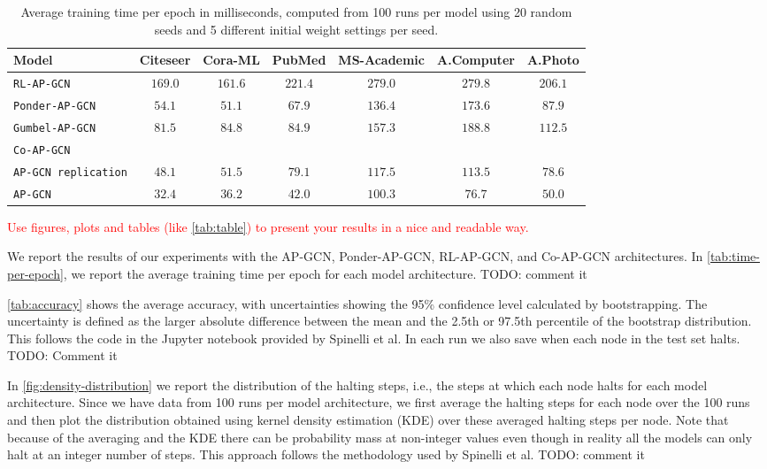 \documentclass{gdl}
\begin{document}
\begin{table}[h]
    \small\sf\centering
    \caption{Average training time per epoch in milliseconds, computed from 100 runs per model using 20 random seeds and 5 different initial weight settings per seed.}
    \begin{tabular}{l c c c c c c}
        \toprule
        Model & Citeseer & Cora-ML & PubMed & MS-Academic & A.Computer & A.Photo   \\
        \midrule
        \texttt{RL-AP-GCN} &$169.0$&$161.6$&$221.4$&$279.0$&$279.8$&$206.1$  \\
        \texttt{Ponder-AP-GCN} &$54.1$&$51.1$&$67.9$&$136.4$&$173.6$&$87.9$   \\
        \texttt{Gumbel-AP-GCN} &$81.5$&$84.8$&$84.9$&$157.3$&$188.8$&$112.5$   \\
        \texttt{Co-AP-GCN}  \\
        \texttt{AP-GCN replication} &$48.1$&$51.5$&$79.1$&$117.5$&$113.5$&$78.6$  \\
        \midrule
        \texttt{AP-GCN} & $32.4$ & $36.2$ & $42.0$ & $100.3$ & $76.7$ & $50.0$ \\
        \bottomrule 
    \end{tabular}
    \label{tab:time-per-epoch}
\end{table}

\textcolor{red}{Use figures, plots and tables (like \autoref{tab:table}) to present your results in a nice and readable way.}

We report the results of our experiments with the AP-GCN, Ponder-AP-GCN, RL-AP-GCN, and Co-AP-GCN architectures. In \autoref{tab:time-per-epoch}, we report the average training time per epoch for each model architecture. TODO: comment it 

\autoref{tab:accuracy} shows the average accuracy, with uncertainties showing the 95\% confidence level calculated by bootstrapping. The uncertainty is defined as the larger absolute difference between the mean and the 2.5th or 97.5th percentile of the bootstrap distribution. This follows the code in the Jupyter notebook provided by Spinelli et al. In each run we also save when each node in the test set halts. TODO: Comment it

In \autoref{fig:density-distribution} we report the distribution of the halting steps, i.e., the steps at which each node halts for each model architecture. Since we have data from 100 runs per model architecture, we first average the halting steps for each node over the 100 runs and then plot the distribution obtained using kernel density estimation (KDE) over these averaged halting steps per node. Note that because of the averaging and the KDE there can be probability mass at non-integer values even though in reality all the models can only halt at an integer number of steps. This approach follows the methodology used by Spinelli et al. TODO: comment it
\end{document}
